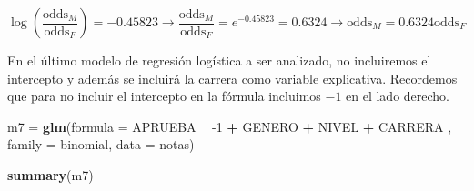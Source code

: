 \documentclass[letterpaper,]{book}
\newenvironment{Shaded}{\begin{snugshade}}{\end{snugshade}}
\newcommand{\DataTypeTok}[1]{\textcolor[rgb]{0.13,0.29,0.53}{#1}}
\newcommand{\DecValTok}[1]{\textcolor[rgb]{0.00,0.00,0.81}{#1}}
\newcommand{\KeywordTok}[1]{\textcolor[rgb]{0.13,0.29,0.53}{\textbf{#1}}}
\newcommand{\NormalTok}[1]{#1}
\newcommand{\OperatorTok}[1]{\textcolor[rgb]{0.81,0.36,0.00}{\textbf{#1}}}
\newcommand{\StringTok}[1]{\textcolor[rgb]{0.31,0.60,0.02}{#1}}
\begin{document}
\[\log \left( \dfrac{\text{odds}_{M}}{\text{odds}_{F}}\right)=-0.45823 \rightarrow \dfrac{\text{odds}_{M}}{\text{odds}_{F}}=e^{-0.45823}=0.6324\rightarrow \text{odds}_{M} = 0.6324\text{odds}_{F}\]

En el último modelo de regresión logística a ser analizado, no incluiremos el intercepto y además se incluirá la carrera como variable explicativa. Recordemos que para no incluir el intercepto en la fórmula incluimos \(-1\) en el lado derecho.

\begin{Shaded}
\begin{Highlighting}[]
\NormalTok{m7 =}\StringTok{ }\KeywordTok{glm}\NormalTok{(}\DataTypeTok{formula =}\NormalTok{ APRUEBA }\OperatorTok{~}\StringTok{ }\DecValTok{-1} \OperatorTok{+}\StringTok{ }\NormalTok{GENERO }\OperatorTok{+}\StringTok{ }\NormalTok{NIVEL }\OperatorTok{+}\StringTok{ }\NormalTok{CARRERA , }\DataTypeTok{family =}\NormalTok{ binomial, }\DataTypeTok{data =}\NormalTok{ notas)}

\KeywordTok{summary}\NormalTok{(m7)}
\end{Highlighting}
\end{Shaded}
\end{document}
